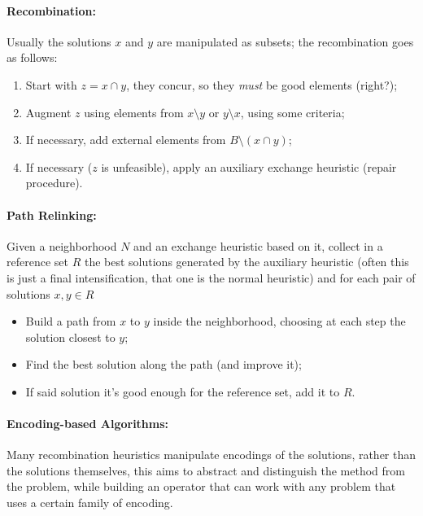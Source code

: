 \documentclass{article}
\begin{document}
	\paragraph{Recombination:} Usually the solutions $x$ and $y$ are manipulated as subsets; the recombination goes as follows: 
	\begin{enumerate}
		\item Start with $z = x \cap y$, they concur, so they \textit{must} be good elements (right?);
		\item Augment $z$ using elements from $x\setminus y$ or $y \setminus x$, using some criteria;
		\item If necessary, add external elements from $B \setminus (x \cap y)$;
		\item If necessary ($z$ is unfeasible), apply an auxiliary exchange heuristic (repair procedure).\\
	\end{enumerate}
	
	\paragraph{Path Relinking:} Given a neighborhood $N$ and an exchange heuristic based on it, collect in a reference set $R$ the best solutions generated by the auxiliary heuristic (often this is just a final intensification, that one is the normal heuristic) and for each pair of solutions $x,y \in R$
	\begin{itemize}
		\item Build a path from $x$ to $y$ inside the neighborhood, choosing at each step the solution closest to $y$;
		\item Find the best solution along the path (and improve it);
		\item If said solution it's good enough for the reference set, add it to $R$.\\
	\end{itemize}
	
	\paragraph{Encoding-based Algorithms:} Many recombination heuristics manipulate encodings of the solutions, rather than the solutions themselves, this aims to abstract and distinguish the method from the problem, while building an operator that can work with any problem that uses a certain family of encoding.\\
	
\end{document}
